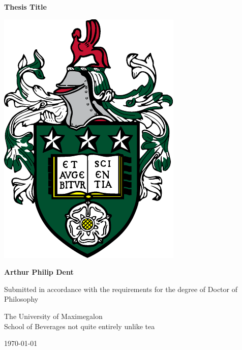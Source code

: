 \documentclass[11pt,a4paper,twoside]{book}
\begin{document}
\frontmatter


\begin{titlepage}
    \begin{center}
            
        \Huge
        \textbf{Thesis Title}
    
        \vspace{2cm}
        
        \LARGE
        
        \includegraphics[width=.52\textwidth]{University_of_Leeds_crest-fixed.pdf}

        \vfill
            
        \textbf{Arthur Philip Dent}

            
        Submitted in accordance with the requirements for the degree of Doctor of Philosophy
            
        \vspace{0.8cm}
                        
        \Large
        The University of Maximegalon\\
        School of Beverages not quite entirely unlike tea\\

        \vspace{0.8cm}
        
        \today
            
    \end{center}
\end{titlepage}
\end{document}
